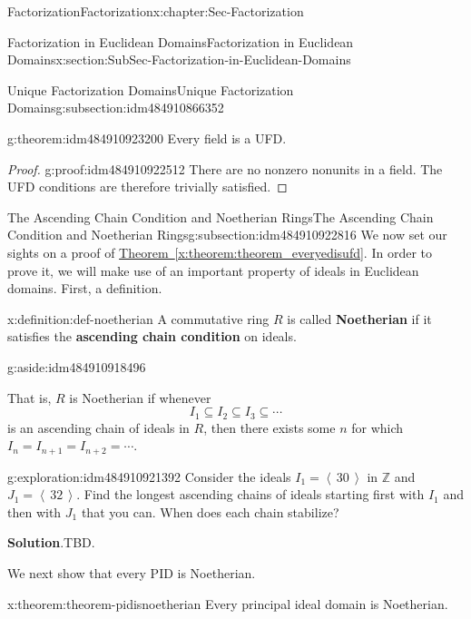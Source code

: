 \documentclass[oneside,10pt,]{book}
\newcommand{\blocktitlefont}{\relax}
\newcommand{\xreffont}{\relax}
\newcommand{\terminology}[1]{\textbf{#1}}
\numberwithin{equation}{section}
\newcommand{\ideal}[1]{\left\langle\, #1 \,\right\rangle}
\def\Z{{\mathbb Z}}
\begin{document}
\begin{chapterptx}{Factorization}{}{Factorization}{}{}{x:chapter:Sec-Factorization}
\begin{sectionptx}{Factorization in Euclidean Domains}{}{Factorization in Euclidean Domains}{}{}{x:section:SubSec-Factorization-in-Euclidean-Domains}
\begin{subsectionptx}{Unique Factorization Domains}{}{Unique Factorization Domains}{}{}{g:subsection:idm484910866352}
\begin{theorem}{}{}{g:theorem:idm484910923200}%
Every field is a UFD.%
\end{theorem}
\begin{proof}{}{g:proof:idm484910922512}
There are no nonzero nonunits in a field. The UFD conditions are therefore trivially satisfied.\end{proof}
\end{subsectionptx}
%
%
\typeout{************************************************}
\typeout{************************************************}
%
\begin{subsectionptx}{The Ascending Chain Condition and Noetherian Rings}{}{The Ascending Chain Condition and Noetherian Rings}{}{}{g:subsection:idm484910922816}
We now set our sights on a proof of \hyperref[x:theorem:theorem_everyedisufd]{Theorem~{\xreffont\ref{x:theorem:theorem_everyedisufd}}}. In order to prove it, we will make use of an important property of ideals in Euclidean domains. First, a definition.%
\begin{definition}{}{x:definition:def-noetherian}%
A commutative ring \(R\) is called \terminology{Noetherian} if it satisfies the \terminology{ascending chain condition} on ideals. \begin{aside}{}{g:aside:idm484910918496}%
\end{aside}
 That is, \(R\) is Noetherian if whenever%
\begin{equation*}
I_1 \subseteq I_2\subseteq I_3\subseteq \cdots
\end{equation*}
is an ascending chain of ideals in \(R\), then there exists some \(n\) for which \(I_n = I_{n+1} = I_{n+2} = \cdots\).%
\end{definition}
\begin{exploration}{}{g:exploration:idm484910921392}%
Consider the ideals \(I_1 = \ideal{30}\) in \(\Z\) and \(J_1 = \ideal{32}\). Find the longest ascending chains of ideals starting first with \(I_1\) and then with \(J_1\) that you can. When does each chain stabilize?%
\par\smallskip%
\noindent\textbf{\blocktitlefont Solution}.\hypertarget{g:solution:idm484910914160}{}\quad{}TBD.\end{exploration}
We next show that every PID is Noetherian.%
\begin{theorem}{}{}{x:theorem:theorem-pidisnoetherian}%
Every principal ideal domain is Noetherian.%


\end{theorem}
\end{subsectionptx}
\end{sectionptx}
\end{chapterptx}
\end{document}
